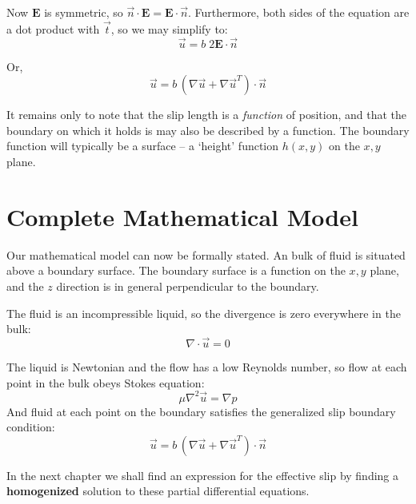 \documentclass[a4paper]{report}
\begin{document}
Now $\mathbf{E}$ is symmetric, so $\vec{n} \cdot \mathbf{E} = \mathbf{E} \cdot \vec{n}$.  Furthermore, both sides of the equation are a dot product with $\vec{t}$, so we may simplify to:
\begin{equation}
\vec{u} = b \; 2 \mathbf{E} \cdot \vec{n}
\end{equation}

Or,
\begin{equation}
\vec{u} = b \, (\nabla \vec{u} + \nabla \vec{u}^T) \cdot \vec{n}
\end{equation}


\vspace{1em}

It remains only to note that the slip length is a \emph{function} of position, and that the boundary on which it holds is may also be described by a function. The boundary function will typically be a surface -- a `height' function $h(x,y)$ on the $x,y$ plane.

\section*{Complete Mathematical Model}

Our mathematical model can now be formally stated.  An bulk of fluid is situated above a boundary surface.  
The boundary surface is a function on the $x,y$ plane, and the $z$ direction is in general perpendicular to the boundary.

The fluid is an incompressible liquid, so the divergence is zero everywhere in the bulk:
\begin{equation}
\nabla \cdot \vec{u} = 0
\end{equation}

The liquid is Newtonian and the flow has a low Reynolds number, so flow at each point in the bulk obeys Stokes equation:
\begin{equation}
\mu \nabla^2 \vec{u} = \nabla p
\end{equation}
And fluid at each point on the boundary satisfies the generalized slip boundary condition:
\begin{equation}
\vec{u} = b \, (\nabla \vec{u} + \nabla \vec{u}^T) \cdot \vec{n}
\end{equation}


\vspace*{3em}
In the next chapter we shall find an expression for the effective slip by finding a \textbf{homogenized} solution to these partial differential equations.





\end{document}
